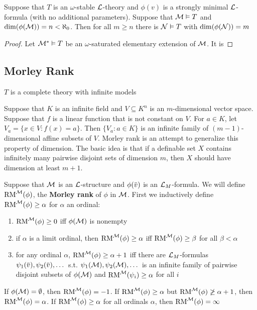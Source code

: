 \documentclass[11pt]{article}
\begin{document}
\begin{lemma}[]
Suppose that \(T\) is an \(\omega\)-stable \(\mathcal{L}\)-theory and \(\phi(v)\) is a strongly minimal \(\mathcal{L}\)-formula
(with no additional parameters). Suppose that \(\mathcal{M}\vDash T\) and \(\dim(\phi(\mathcal{M}))=n<\aleph_0\). Then for
all \(m\ge n\) there is \(\mathcal{N}\vDash T\) with \(\dim(\phi(\mathcal{N}))=m\)
\end{lemma}

\begin{proof}
Let \(\mathcal{M}^*\vDash T\)  be an \(\omega\)-saturated elementary extension of \(\mathcal{M}\). It is
\end{proof}

\subsection{Morley Rank}
\label{sec:orgde99b2a}
\(T\) is a complete theory with infinite models

Suppose that \(K\) is an infinite field and \(V\subseteq K^n\) is an \(m\)-dimensional vector space.
Suppose that \(f\) is a linear function that is not constant on \(V\). For \(a\in K\),
let \(V_a=\{x\in V:f(x)=a\}\). Then \(\{V_a:a\in K\}\) is an infinite family of \((m-1)\)-dimensional
affine subsets of \(V\). Morley rank is an attempt to generalize this property of dimension. The
basic idea is that if a definable set \(X\) contains infinitely many pairwise disjoint sets of
dimension \(m\), then \(X\) should have dimension at least \(m+1\).

\begin{definition}[]
Suppose that \(\mathcal{M}\) is an \(\mathcal{L}\)-structure and \(\phi(\barv)\) is an \(\mathcal{L}_M\)-formula. We will
define \(\operatorname{RM}^{\mathcal{M}}(\phi)\), the \textbf{Morley rank} of \(\phi\) in \(\mathcal{M}\). First we inductively
define \(\operatorname{RM}^{\mathcal{M}}(\phi)\ge\alpha\) for \(\alpha\) an ordinal:
\begin{enumerate}
\item \(\operatorname{RM}^{\mathcal{M}}(\phi)\ge 0\) iff \(\phi(\mathcal{M})\) is nonempty
\item if \(\alpha\) is a limit ordinal, then \(\operatorname{RM}^{\mathcal{M}}(\phi)\ge\alpha\) iff \(\operatorname{RM}^{\mathcal{M}}(\phi)\ge\beta\) for all \(\beta<\alpha\)
\item for any ordinal \(\alpha\), \(\operatorname{RM}^{\mathcal{M}}(\phi)\ge\alpha+1\) iff there
are \(\mathcal{L}_M\)-formulas \(\psi_1(\barv),\psi_2(\barv),\dots\) s.t. \(\psi_1(\mathcal{M}),\psi_2(\mathcal{M}),\dots\) is an infinite family
of pairwise disjoint subsets of \(\phi(\mathcal{M})\) and \(\operatorname{RM}^{\mathcal{M}}(\psi_i)\ge\alpha\) for all \(i\)
\end{enumerate}


If \(\phi(\mathcal{M})=\emptyset\), then \(\operatorname{RM}^{\mathcal{M}}(\phi)=-1\). If \(\operatorname{RM}^{\mathcal{M}}(\phi)\ge\alpha\) but \(\operatorname{RM}^{\mathcal{M}}(\phi)\not\ge\alpha+1\),
then \(\operatorname{RM}^{\mathcal{M}}(\phi)=\alpha\). If \(\operatorname{RM}^{\mathcal{M}}(\phi)\ge\alpha\) for all ordinals \(\alpha\), then \(\operatorname{RM}^{\mathcal{M}}(\phi)=\infty\)
\end{definition}
\end{document}
